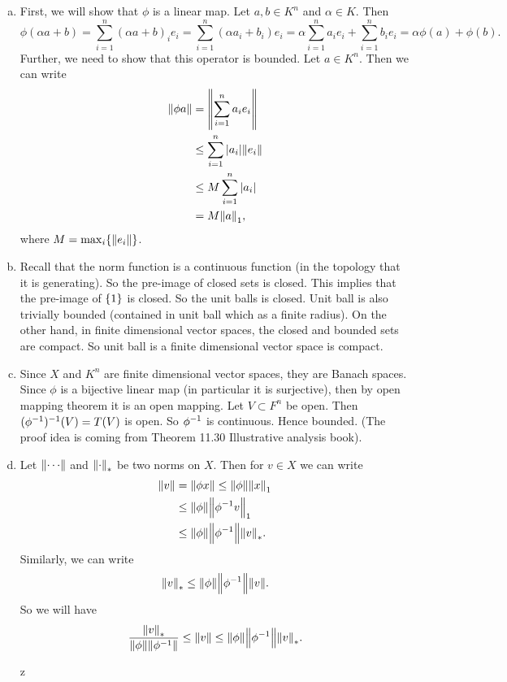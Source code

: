 \begin{solution}
	\begin{enumerate}[(a)]
		\item First, we will show that $ \phi $ is a linear map. Let $ a,b \in K^n $ and $ \alpha \in K $. Then
		\[ \phi(\alpha a + b) = \sum_{i=1}^{n} (\alpha a + b)_i e_i = \sum_{i=1}^{n} (\alpha a_i + b_i) e_i = \alpha \sum_{i=1}^{n}a_i e_i + \sum_{i=1}^{n}b_i e_i = \alpha \phi(a) + \phi(b). \]
		Further, we need to show that this operator is bounded. Let $ a\in K^n $. Then we can write
		\begin{align*}
			\norm{\phi a} &= \norm{\sum_{i=1}^{n} a_i e_i} \\
			& \leq \sum_{i=1}^{n} |a_i|\norm{e_i} \\
			& \leq M \sum_{i=1}^{n} |a_i| \\
			&=  M\norm{a}_1,
		\end{align*}
		where $ M = \max_{i}\{\norm{e_i}\} $.
		
		
		\item Recall that the norm function is a continuous function (in the topology that it is generating). So the pre-image of closed sets is closed. This implies that the pre-image of $ \{1\} $ is closed. So the unit balls is closed. Unit ball is also trivially bounded (contained in unit ball which as a finite radius). On the other hand, in finite dimensional vector spaces, the closed and bounded sets are compact. So unit ball is a finite dimensional vector space is compact.
		
		
		\item Since $ X $ and $ K^n $ are finite dimensional vector spaces, they are Banach spaces. Since $ \phi $ is a bijective linear map (in  particular it is surjective), then by open mapping theorem it is an open mapping. Let $ V \subset F^n $ be open. Then $ (\phi^{-1})^{-1}(V) = T(V)$ is open. So $ \phi^{-1} $ is continuous. Hence bounded. (The proof idea is coming from Theorem 11.30 Illustrative analysis book). 
		
		
		\item Let $ \norm{\cdots} $ and $ \norm{\cdot}_* $ be two norms on $ X $. Then for $ v\in X $ we can write
		\begin{align*}
			\norm{v} &= \norm{\phi x} \leq \norm{\phi}\norm{x}_1 \\
			&\leq  \norm{\phi}\norm{\phi^{-1}v}_1 \\
			&\leq \norm{\phi}\norm{\phi^{-1}}\norm{v}_*.
		\end{align*}
		Similarly, we can write
		\[ \norm{v}_* \leq \norm{\phi}\norm{\phi^{-1}}\norm{v}. \]
		So we will have
		\[ \frac{\norm{v}_*}{\norm{\phi}\norm{\phi^{-1}}} \leq \norm{v} \leq \norm{\phi}\norm{\phi^{-1}} \norm{v}_*.  \]
		
		
	z
		
		
		
		
		
		
		
		
		
	\end{enumerate}
	
\end{solution}